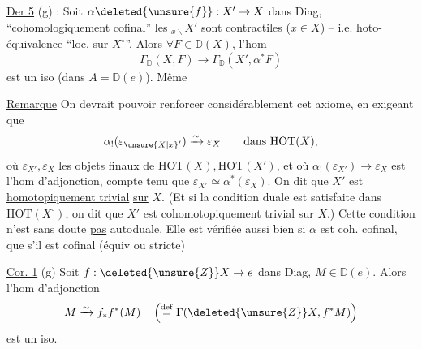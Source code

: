 \uline{Der 5} (g) : Soit $\alpha\deleted{\unsure{f}}:X'\to X$ dans Diag, ``cohomologiquement cofinal'' les ${}_{x\backslash}X'$ sont contractiles ($x\in X$) -- i.e.   hoto-équivalence ``loc. sur $X^\circ$''. Alors $\forall F\in\mathbb D(X)$, l'hom
\[
 \Gamma_{\mathbb D}(X,F)\longrightarrow\Gamma_{\mathbb D}(X',\alpha^*F)
\]
est un iso (dans $A=\mathbb D(e)$). Même 

\uline{Remarque} On devrait pouvoir renforcer considérablement cet axiome, en exigeant que
\[
 \alpha_!(\varepsilon_{\unsure{X|x}'})\xrightarrow{\sim}\varepsilon_X\qquad\text{dans }\mathrm{HOT}(X),
\]
où $\varepsilon_{X'},\varepsilon_X$ les objets finaux de $\mathrm{HOT}(X),\mathrm{HOT}(X')$, et où $\alpha_!(\varepsilon_{X'})\to\varepsilon_X$ est l'hom d'adjonction, compte tenu que $\varepsilon_{X'}\simeq\alpha^*(\varepsilon_X)$. On dit que $X'$ est \uline{homotopiquement trivial} \uline{sur} $X$. (Et si la condition duale est satisfaite dans $\mathrm{HOT}(X^\circ)$, on dit que $X'$ est cohomotopiquement trivial sur $X$.) Cette condition n'est sans doute \uline{pas} autoduale. Elle est vérifiée aussi bien si $\alpha$ est coh. cofinal, que s'il est  cofinal (équiv  ou stricte)


\uline{Cor. 1} (g) Soit $f:\deleted{\unsure{Z}}X\to e$ dans Diag,  $M\in\mathbb D(e)$. Alors l'hom d'adjonction
\[
 M\xrightarrow{\sim}f_*f^*(M)\quad\left(\overset{\mathrm{def}}{=}\Gamma(\deleted{\unsure{Z}}X,f^*M)\right)
\]
est un iso.

